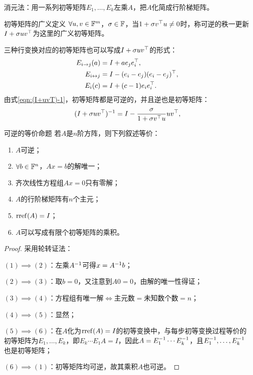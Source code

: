 \begin{remark}
	消元法：用一系列初等矩阵$E_1,\ldots,E_k$左乘$A$，把$A$化简成行阶梯矩阵。
\end{remark}

\begin{definition}
	{初等矩阵的广义定义}{}
	$\forall u,v \in \mathbb{F}^m$，$\sigma \in \mathbb{F}$，当$1 + \sigma v^\top u \neq 0$时，称可逆的秩一更新$I + \sigma uv^\top$为这里的广义初等矩阵。
\end{definition}
\begin{remark}
	三种行变换对应的初等矩阵也可以写成$I + \sigma uv^\top$的形式：
	\begin{subequations}
		\begin{align}
			E_{i\to j}(a) &= I + ae_je_i^\top,\\
			E_{i\leftrightarrow j} &= I - (e_i - e_j)(e_i - e_j)^\top,\\
			E_i(c) &= I + (c - 1)e_ie_i^\top.
		\end{align}
	\end{subequations}
	由式\eqref{eqn:(I+uvT)-1}，初等矩阵都是可逆的，并且逆也是初等矩阵：
	\begin{equation}
		(I + \sigma uv^\top)^{-1} = I - \frac{\sigma}{1 + \sigma v^\top u}uv^\top,
	\end{equation}
\end{remark}

\begin{theorem}
	{可逆的等价命题}{}
	若$A$是$n$阶方阵，则下列叙述等价：
	\begin{enumerate}
		\item $A$可逆；
		\item $\forall b \in \mathbb{F}^n$，$Ax = b$的解唯一；
		\item 齐次线性方程组$Ax = 0$只有零解；
		\item $A$的行阶梯矩阵有$n$个主元；
		\item $\operatorname{rref}(A) = I$；
		\item $A$可以写成有限个初等矩阵的乘积。
	\end{enumerate}
\end{theorem}

\begin{proof}
	采用轮转证法：

	$(1) \implies (2)$：左乘$A^{-1}$可得$x = A^{-1} b$；

	$(2) \implies (3)$：取$b = 0$，又注意到$A0 = 0$，由解的唯一性得证；

	$(3) \implies (4)$：方程组有唯一解$\iff$主元数$=$未知数个数$= n$；

	$(4) \implies (5)$：显然；

	$(5) \implies (6)$：在$A$化为$\operatorname{rref}(A) = I$的初等变换中，与每步初等变换过程等价的初等矩阵为$E_1,\ldots,E_k$，即$E_k\cdots E_1A = I$，因此$A = E_1^{-1}\cdots E_k^{-1}$，且$E_1^{-1},\ldots,E_k^{-1}$也是初等矩阵；

	$(6) \implies (1)$：初等矩阵均可逆，故其乘积$A$也可逆。
\end{proof}

